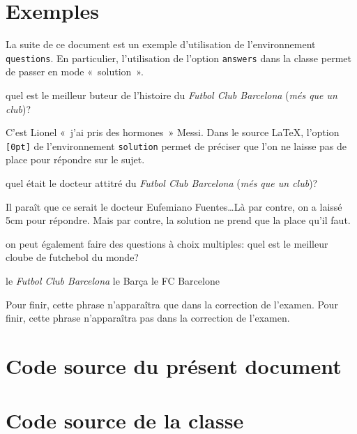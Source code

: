 \documentclass[addpoints,fr,biblatex,name,gradetable]{isae-exam}
\begin{document}
\section{Exemples}
\label{sec:exemples}

La suite de ce document est un exemple d'utilisation de
l'environnement \lstinline!questions!. En particulier, l'utilisation
de l'option \lstinline!answers! dans la classe permet de passer en
mode «~solution~».

\begin{questions}
\question[1] quel est le meilleur buteur de l'histoire du \textit{Futbol
  Club Barcelona} (\textit{més que un club})?

\begin{solution}[0pt]

  C'est Lionel «~j'ai pris des hormones~» Messi. Dans le source
  \LaTeX, l'option \lstinline![0pt]! de l'environnement
  \lstinline!solution! permet de préciser que l'on ne laisse pas de
  place pour répondre sur le sujet.
\end{solution}

\question[1\half] quel était le docteur attitré du \textit{Futbol
  Club Barcelona} (\textit{més que un club})?

\begin{solution}[5cm]

  Il paraît que ce serait le docteur Eufemiano Fuentes\ldots Là par
  contre, on a laissé 5cm pour répondre. Mais par contre, la
  solution ne prend que la place qu'il faut.
\end{solution}

\question[\half] on peut également faire des questions à choix multiples:
quel est le meilleur cloube de futchebol du monde?

\begin{checkboxes}
  \CorrectChoice le \textit{Futbol Club Barcelona}
  \choice le Barça
  \choice le FC Barcelone
\end{checkboxes}
\end{questions}

\ifprintanswers
  Pour finir, cette phrase n'apparaîtra que dans la correction de l'examen.
\else
  Pour finir, cette phrase n'apparaîtra pas dans la correction de l'examen.
\fi

\section{Code source du présent document}
\label{sec:code-source-doc}



\section{Code source de la classe}
\label{sec:code-source-classe}



\printbibliography
\end{document}
